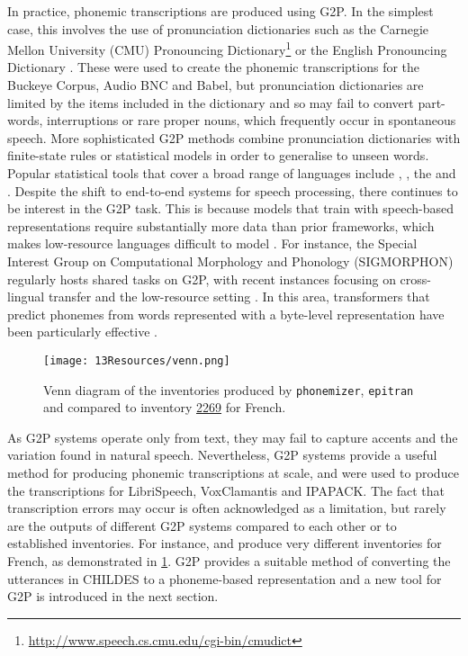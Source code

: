 In practice, phonemic transcriptions are produced using G2P. In the simplest case, this involves the use of pronunciation dictionaries such as the Carnegie Mellon University (CMU) Pronouncing Dictionary\footnote{\url{http://www.speech.cs.cmu.edu/cgi-bin/cmudict}} or the English Pronouncing Dictionary \citep{jones2011cambridge}. These were used to create the phonemic transcriptions for the Buckeye Corpus, Audio BNC and Babel, but pronunciation dictionaries are limited by the items included in the dictionary and so may fail to convert part-words, interruptions or rare proper nouns, which frequently occur in spontaneous speech. More sophisticated G2P methods combine pronunciation dictionaries with finite-state rules \citep{kaplan1994regular} or statistical models \citep{bisani-2008-g2p} in order to generalise to unseen words. Popular statistical tools that cover a broad range of languages include  \citep{NOVAK_MINEMATSU_HIROSE_2016},  \citep{Mortensen-et-al:2018}, the  \citep{johnson2020g2p} and  \citep{Bernard2021}. Despite the shift to end-to-end systems for speech processing, there continues to be interest in the G2P task. This is because models that train with speech-based representations require substantially more data than prior frameworks, which makes low-resource languages difficult to model \citep{li2022recent}. For instance, the Special Interest Group on Computational Morphology and Phonology (SIGMORPHON) regularly hosts shared tasks on G2P, with recent instances focusing on cross-lingual transfer and the low-resource setting \citep{mccarthy-etal-2023-sigmorphon}. In this area, transformers that predict phonemes from words represented with a byte-level representation have been particularly effective \citep{Zhu2022}. 

\begin{figure}[t]
    \centering
    \texttt{[image: 13Resources/venn.png]}
    \caption{Venn diagram of the inventories produced by \texttt{phonemizer}, \texttt{epitran} and \gpp compared to \phoible inventory \href{https://phoible.org/inventories/view/2269}{2269} for French.}
    \label{fig:13-venn}
\end{figure}

As G2P systems operate only from text, they may fail to capture accents and the variation found in natural speech. Nevertheless, G2P systems provide a useful method for producing phonemic transcriptions at scale, and were used to produce the transcriptions for LibriSpeech, VoxClamantis and IPAPACK. The fact that transcription errors may occur is often acknowledged as a limitation, but rarely are the outputs of different G2P systems compared to each other or to established inventories. For instance,  and  produce very different inventories for French, as demonstrated in \cref{fig:13-venn}. G2P provides a suitable method of converting the utterances in CHILDES to a phoneme-based representation and a new tool for G2P is introduced in the next section.

